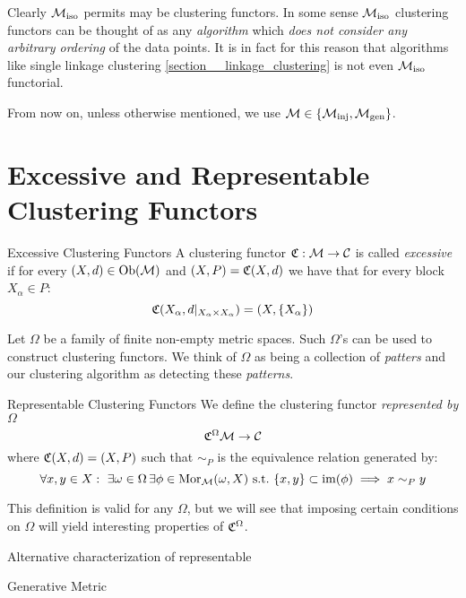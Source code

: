 Clearly ${\mathcal{M}_\mathrm{iso}}$ permits may be clustering functors.
In some sense ${\mathcal{M}_\mathrm{iso}}$ clustering functors can be thought of as any \emph{algorithm} which \emph{does not consider any arbitrary ordering} of the data points.
It is in fact for this reason that algorithms like single linkage clustering \ref{section__linkage_clustering} is not even ${\mathcal{M}_\mathrm{iso}}$ functorial.

From now on, unless otherwise mentioned, we use $\mathcal{M} \in \{{\mathcal{M}_\mathrm{inj}}, {\mathcal{M}_\mathrm{gen}}\}$.

\section{Excessive and Representable Clustering Functors}
\begin{definition}{Excessive Clustering Functors}{}
A clustering functor $\mathfrak{C}: \mathcal{M} \to \mathcal{C}$ is called \emph{excessive} if for every $(X,d) \in \mathrm {Ob}(\mathcal{M})$ and $(X,P) = \mathfrak{C}(X,d)$ we have that for every block $X_\alpha \in P$:
$$
\mathfrak{C}(X_\alpha, d|_{X_\alpha \times X_\alpha}) = (X, \{X_\alpha\})
$$
\end{definition}

Let $\Omega$ be a family of finite non-empty metric spaces. Such $\Omega$'s can be used to construct clustering functors. We think of $\Omega$ as being a collection of \emph{patters} and our clustering algorithm as detecting these \emph{patterns}.



\begin{definition}{Representable Clustering Functors}{}
We define the clustering functor \emph{represented by $\Omega$}
$$
\mathfrak{C}^\Omega \mathcal{M} \to \mathcal{C}
$$
where $\mathfrak{C}(X,d) = (X, P)$ such that $\sim_P$ 
is the equivalence relation generated by:
\begin{equation*}
    \forall x,y \in X: \ \exists \omega \in \Omega \,\exists \phi \in \mathrm {Mor}_{\mathcal{M}}(\omega, X) \ \text{s.t.} \ \{x,y\} \subset \operatorname*{im}(\phi) \implies x \sim_P y
\end{equation*}
\end{definition}

This definition is valid for any $\Omega$, but we will see that imposing certain conditions on $\Omega$ will yield interesting properties of $\mathfrak{C}^\Omega$.

\begin{myremark}{}{}
    Alternative characterization of representable
\end{myremark}

\begin{definition}{Generative Metric}{}
\end{definition}

